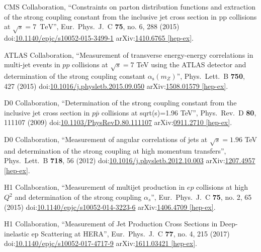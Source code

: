 \begin{thebibliography}{99}
CMS Collaboration, ``Constraints on parton distribution functions and extraction of the strong coupling constant from the inclusive jet cross section in pp collisions at $\sqrt{s} = 7$ $\,\text {TeV}$'', Eur.\ Phys.\ J.\ C {\bf 75}, no. 6, 288 (2015) doi:\href{http://dx.doi.org/10.1140/epjc/s10052-015-3499-1}{10.1140/epjc/s10052-015-3499-1} arXiv:\href{https://arxiv.org/abs/1410.6765}{1410.6765 [hep-ex]}.

ATLAS Collaboration, ``Measurement of transverse energy-energy correlations in multi-jet events in $pp$ collisions at $\sqrt{s} = 7$ TeV using the ATLAS detector and determination of the strong coupling constant $\alpha_{\mathrm{s}}(m_Z)$'', Phys.\ Lett.\ B {\bf 750}, 427 (2015) doi:\href{http://dx.doi.org/10.1016/j.physletb.2015.09.050}{10.1016/j.physletb.2015.09.050} arXiv:\href{https://arxiv.org/abs/1508.01579}{1508.01579 [hep-ex]}.

D0 Collaboration, ``Determination of the strong coupling constant from the inclusive jet cross section in $p\bar{p}$ collisions at sqrt(s)=1.96 TeV'', Phys.\ Rev.\ D {\bf 80}, 111107 (2009) doi:\href{http://dx.doi.org/10.1103/PhysRevD.80.111107}{10.1103/PhysRevD.80.111107} arXiv:\href{https://arxiv.org/abs/0911.2710}{0911.2710 [hep-ex]}.

D0 Collaboration, ``Measurement of angular correlations of jets at $\sqrt{s}=1.96$ TeV and determination of the strong coupling at high momentum transfers'', Phys.\ Lett.\ B {\bf 718}, 56 (2012) doi:\href{http://dx.doi.org/10.1016/j.physletb.2012.10.003}{10.1016/j.physletb.2012.10.003} arXiv:\href{https://arxiv.org/abs/1207.4957}{1207.4957 [hep-ex]}.

H1 Collaboration, ``Measurement of multijet production in $ep$ collisions at high $Q^2$ and determination of the strong coupling $\alpha _s$'', Eur.\ Phys.\ J.\ C {\bf 75}, no. 2, 65 (2015) doi:\href{http://dx.doi.org/10.1140/epjc/s10052-014-3223-6}{10.1140/epjc/s10052-014-3223-6} arXiv:\href{https://arxiv.org/abs/1406.4709}{1406.4709 [hep-ex]}.

H1 Collaboration, ``Measurement of Jet Production Cross Sections in Deep-inelastic ep Scattering at HERA'', Eur.\ Phys.\ J.\ C {\bf 77}, no. 4, 215 (2017) doi:\href{http://dx.doi.org/10.1140/epjc/s10052-017-4717-9}{10.1140/epjc/s10052-017-4717-9} arXiv:\href{https://arxiv.org/abs/1611.03421}{1611.03421 [hep-ex]}.


\end{thebibliography}
